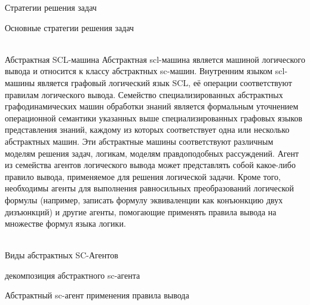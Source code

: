 \begin{frame}{Стратегии решения задач}
\begin{frame}{\large Основные стратегии решения задач}
\begin{textitemize}
\begin{frame}{\\Абстрактная SCL-машина}
Абстрактная scl-машина является машиной логического вывода и относится к классу абстрактных sc-машин. Внутренним языком scl-машины является графовый логический язык SCL, её операции соответствуют правилам логического вывода. Семейство специализированных абстрактных графодинамических машин обработки знаний является формальным уточнением операционной семантики указанных выше специализированных графовых языков представления знаний, каждому из которых соответствует одна или несколько абстрактных машин. Эти абстрактные машины соответствуют различным моделям решения задач, логикам, моделям правдоподобных рассуждений. Агент из семейства агентов логического вывода может представлять собой какое-либо правило вывода, применяемое для решения логической задачи. Кроме того, необходимы агенты для выполнения равносильных преобразований логической формулы (например, записать формулу эквиваленции как конъюнкцию двух дизъюнкций) и другие агенты, помогающие применять правила вывода на множестве формул языка логики.
\end{frame}

\begin{frame}{\\Виды абстрактных SC-Агентов} 
\topline
    \begin{SCn}
\begin{scnrelfromset}{декомпозиция абстрактного sc-агента}
\end{scnrelfromset}
\begin{scnindent}
\end{scnindent}
\end{SCn}
\end{frame}

\begin{frame}{Абстрактный sc-агент применения правила вывода}
\topline
\vspace{8mm}
 \\


\end{frame}
\end{textitemize}
\end{frame}
\end{frame}
